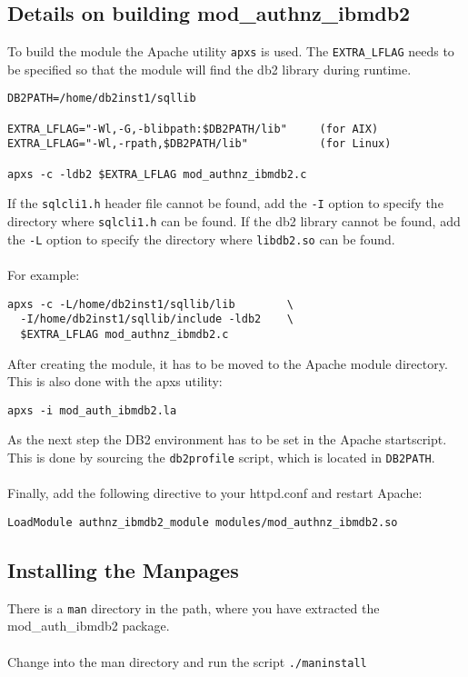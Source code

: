 \documentclass[11pt,a4paper]{article}
\begin{document}
\subsection{Details on building mod\_authnz\_ibmdb2}
To build the module the Apache utility {\tt apxs} is used. The {\tt EXTRA\_LFLAG} needs to be specified so that the module will find the db2 library during runtime.
\begin{verbatim}
DB2PATH=/home/db2inst1/sqllib

EXTRA_LFLAG="-Wl,-G,-blibpath:$DB2PATH/lib"     (for AIX)
EXTRA_LFLAG="-Wl,-rpath,$DB2PATH/lib"           (for Linux)

apxs -c -ldb2 $EXTRA_LFLAG mod_authnz_ibmdb2.c
\end{verbatim}
If the {\tt sqlcli1.h} header file cannot be found, add the {\tt -I} option to specify the
directory where {\tt sqlcli1.h} can be found.
If the db2 library cannot be found, add the {\tt -L} option to specify the
directory where {\tt libdb2.so} can be found.\\
\\
For example:
\begin{verbatim}
apxs -c -L/home/db2inst1/sqllib/lib        \
  -I/home/db2inst1/sqllib/include -ldb2    \
  $EXTRA_LFLAG mod_authnz_ibmdb2.c
\end{verbatim}
After creating the module, it has to be moved to the Apache module directory. This is also done with the apxs utility:
\begin{verbatim}
apxs -i mod_auth_ibmdb2.la
\end{verbatim}
As the next step the DB2 environment has to be set in the Apache startscript. This is done by sourcing the {\tt db2profile} script, which is located in {\tt DB2PATH}.\\
\\
Finally, add the following directive to your httpd.conf and restart Apache:
\begin{verbatim}
LoadModule authnz_ibmdb2_module modules/mod_authnz_ibmdb2.so
\end{verbatim}

\subsection{Installing the Manpages}
There is a {\tt man} directory in the path, where you have extracted the mod\_auth\_ibmdb2 package.\\ 
\\
Change into the man directory and run the script {\tt ./maninstall} 
\newpage
\end{document}
